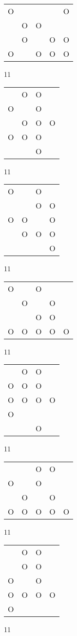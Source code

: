 \begin{tabular}{|m{0.2cm}m{0.2cm}m{0.2cm}m{0.2cm}m{0.2cm}|}\hline
O& & & &O\\
 &O&O& & \\
 &O& &O&O\\
O& &O&O&O\\
\hline\end{tabular}11
\begin{tabular}{|m{0.2cm}m{0.2cm}m{0.2cm}m{0.2cm}|}\hline
 &O&O& \\
O& &O& \\
 &O&O&O\\
O&O&O& \\
 & &O& \\
\hline\end{tabular}11
\begin{tabular}{|m{0.2cm}m{0.2cm}m{0.2cm}m{0.2cm}|}\hline
O& &O& \\
 & &O&O\\
O&O& &O\\
 &O&O&O\\
 & & &O\\
\hline\end{tabular}11
\begin{tabular}{|m{0.2cm}m{0.2cm}m{0.2cm}m{0.2cm}m{0.2cm}|}\hline
O& &O& & \\
 &O& &O& \\
 & &O&O& \\
O&O&O&O&O\\
\hline\end{tabular}11
\begin{tabular}{|m{0.2cm}m{0.2cm}m{0.2cm}m{0.2cm}|}\hline
 &O&O& \\
O&O&O& \\
O&O&O&O\\
O& & & \\
 & &O& \\
\hline\end{tabular}11
\begin{tabular}{|m{0.2cm}m{0.2cm}m{0.2cm}m{0.2cm}m{0.2cm}|}\hline
 & &O&O& \\
O& &O& & \\
 &O& &O& \\
O&O&O&O&O\\
\hline\end{tabular}11
\begin{tabular}{|m{0.2cm}m{0.2cm}m{0.2cm}m{0.2cm}|}\hline
 &O&O& \\
 &O&O& \\
O& &O& \\
O&O&O&O\\
O& & & \\
\hline\end{tabular}11
